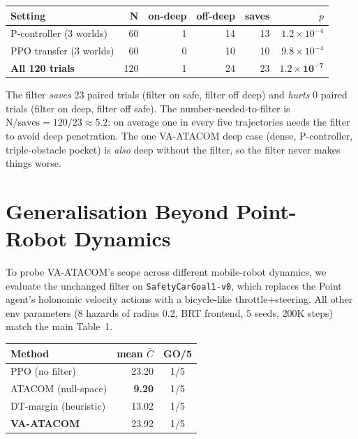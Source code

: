 \documentclass[letterpaper]{article}
\begin{document}
\begin{table}[h]
\centering
\setlength{\tabcolsep}{4pt}
\begin{tabular}{lrrrrr}
\toprule
Setting & N & on-deep & off-deep & saves & $p$\\
\midrule
P-controller (3 worlds) & 60 & 1  & 14 & 13 & $1.2\!\times\!10^{-4}$\\
PPO transfer (3 worlds) & 60 & 0  & 10 & 10 & $9.8\!\times\!10^{-4}$\\
\textbf{All 120 trials}  & 120 & 1 & 24 & 23 & $\boldsymbol{1.2\!\times\!10^{-7}}$\\
\bottomrule
\end{tabular}
\end{table}

The filter \emph{saves} 23 paired trials (filter on safe, filter off deep) and \emph{hurts} 0 paired trials (filter on deep, filter off safe). The number-needed-to-filter is $\textrm{N}/\textrm{saves}=120/23\approx 5.2$: on average one in every five trajectories needs the filter to avoid deep penetration. The one VA-ATACOM deep case (dense, P-controller, triple-obstacle pocket) is \emph{also} deep without the filter, so the filter never makes things worse.

\section{Generalisation Beyond Point-Robot Dynamics}
\label{sec:car-goal}

To probe VA-ATACOM's scope across different mobile-robot dynamics, we evaluate the unchanged filter on \texttt{SafetyCarGoal1-v0}, which replaces the Point agent's holonomic velocity actions with a bicycle-like throttle$+$steering. All other env parameters (8 hazards of radius 0.2, BRT frontend, 5 seeds, 200K steps) match the main Table~1.

\begin{table}[h]
\centering
\setlength{\tabcolsep}{4pt}
\begin{tabular}{lrc}
\toprule
Method & mean $\bar C$ & GO/5\\
\midrule
PPO (no filter)        & 23.20 & 1/5\\
ATACOM (null-space)    & \textbf{9.20}  & 1/5\\
DT-margin (heuristic)  & 13.02 & 1/5\\
\textbf{VA-ATACOM}     & 23.92 & 1/5\\
\bottomrule
\end{tabular}
\end{table}
\end{document}
